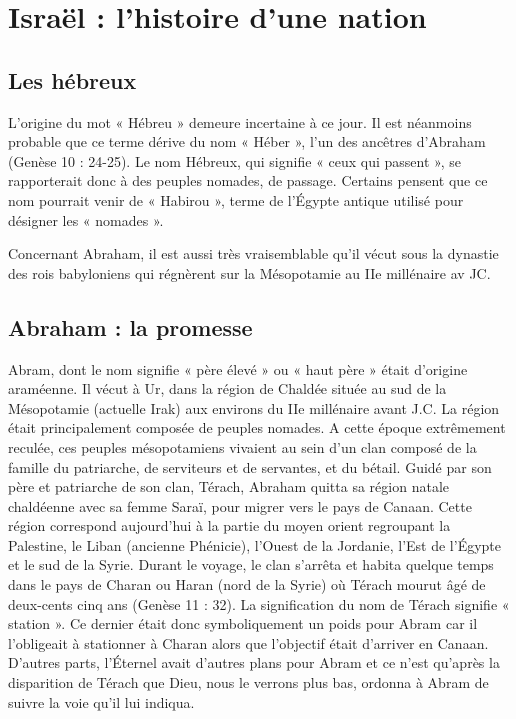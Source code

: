 \section*{Israël : l'histoire d'une nation}

\subsection*{Les hébreux}

L'origine du mot « Hébreu » demeure incertaine à ce jour. Il est néanmoins probable que ce terme dérive du nom « Héber », l'un des ancêtres d'Abraham (Genèse 10 : 24-25). Le nom Hébreux, qui signifie « ceux qui passent », se rapporterait donc à des peuples nomades, de passage.
Certains pensent que ce nom pourrait venir de « Habirou », terme de l’Égypte antique utilisé pour désigner les « nomades ».

Concernant Abraham, il est aussi très vraisemblable qu'il vécut sous la dynastie des rois babyloniens qui régnèrent sur la Mésopotamie au IIe millénaire av JC.

\subsection*{Abraham : la promesse}

Abram, dont le nom signifie « père élevé » ou « haut père » était d'origine araméenne. Il vécut à Ur, dans la région de Chaldée située au sud de la Mésopotamie (actuelle Irak) aux environs du IIe millénaire avant J.C. La région était principalement composée de peuples nomades. A cette époque extrêmement reculée, ces peuples mésopotamiens vivaient au sein d'un clan composé de la famille du patriarche, de serviteurs et de servantes, et du bétail. Guidé par son père et patriarche de son clan, Térach, Abraham quitta sa région natale chaldéenne avec sa femme Saraï, pour migrer vers le pays de Canaan. Cette région correspond aujourd'hui à la partie du moyen orient regroupant la Palestine, le Liban (ancienne Phénicie), l'Ouest de la Jordanie, l'Est de l'Égypte et le sud de la Syrie. Durant le voyage, le clan s'arrêta et habita quelque temps dans le pays de Charan ou Haran (nord de la Syrie) où Térach mourut âgé de deux-cents cinq ans (Genèse 11 : 32).
La signification du nom de Térach signifie « station ». Ce dernier était donc symboliquement un poids pour Abram car il l'obligeait à stationner à Charan alors que l'objectif était d'arriver en Canaan. D'autres parts, l’Éternel avait d'autres plans pour Abram et ce n'est qu'après la disparition de Térach que Dieu, nous le verrons plus bas, ordonna à Abram de suivre la voie qu'il lui indiqua.

